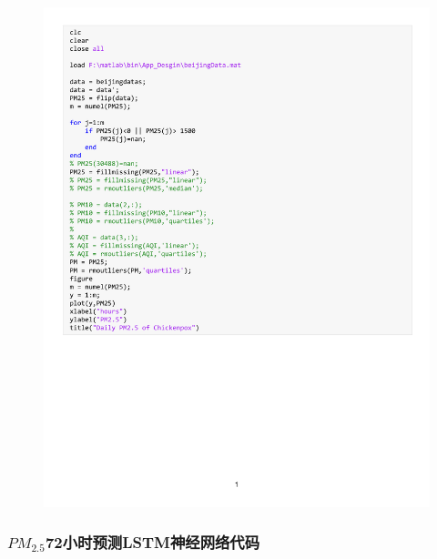 \documentclass[UTF8]{ctexart}
\begin{document}
\begin{figure}[H] %
    \centering %
    \includegraphics[width=1.2\textwidth,page=12]{./code/BeijingNet1.pdf} %
\end{figure}

\subsubsection{$PM_{2.5}$72小时预测LSTM神经网络代码}
\end{document}
